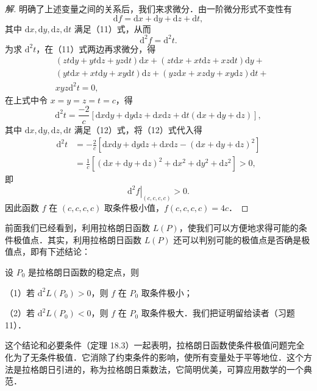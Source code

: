 \begin{proof}[解]
明确了上述变量之间的关系后，我们来求微分．由一阶微分形式不变性有
\[
\mathrm{d}f=\mathrm{d}x+\mathrm{d}y+\mathrm{d}z+\mathrm{d}t,
\]
其中 $\mathrm{d}x,\mathrm{d}y,\mathrm{d}z,\mathrm{d}t$ 满足（11）式，从而
\[
\mathrm{d}^{2}f=\mathrm{d}^{2}t.
\]
为求 $\mathrm{d}^{2}t$，在（11）式两边再求微分，得
\[
\begin{aligned}
&\left(zt\mathrm{d}y+yt\mathrm{d}z+yz\mathrm{d}t\right)\mathrm{d}x+\left(zt\mathrm{d}x+xt\mathrm{d}z+xz\mathrm{d}t\right)\mathrm{d}y+\\
&\left(yt\mathrm{d}x+xt\mathrm{d}y+xy\mathrm{d}t\right)\mathrm{d}z+\left(yz\mathrm{d}x+xz\mathrm{d}y+xy\mathrm{d}z\right)\mathrm{d}t+\\
&xyz\mathrm{d}^{2}t=0,
\end{aligned}
\]
在上式中令 $x=y=z=t=c$，得
\[
\mathrm{d}^{2}t=\frac{-2}{c}\left[\mathrm{d}x\mathrm{d}y+\mathrm{d}y\mathrm{d}z+\mathrm{d}x\mathrm{d}z+\mathrm{d}t\left(\mathrm{d}x+\mathrm{d}y+\mathrm{d}z\right)\right],
\]
其中 $\mathrm{d}x,\mathrm{d}y,\mathrm{d}z,\mathrm{d}t$ 满足（12）式，将（12）式代入得
\[
\begin{aligned}
\mathrm{d}^{2}t&=-\frac{2}{c}\left[\mathrm{d}x\mathrm{d}y+\mathrm{d}y\mathrm{d}z+\mathrm{d}x\mathrm{d}z-\left(\mathrm{d}x+\mathrm{d}y+\mathrm{d}z\right)^{2}\right]\\
&=\frac{1}{c}\left[\left(\mathrm{d}x+\mathrm{d}y+\mathrm{d}z\right)^{2}+\mathrm{d}x^{2}+\mathrm{d}y^{2}+\mathrm{d}z^{2}\right]>0,
\end{aligned}
\]
即
\[
\left.\mathrm{d}^{2}f\right|_{(c,c,c,c)}>0.
\]
因此函数 $f$ 在 $(c,c,c,c)$ 取条件极小值，$f(c,c,c,c)=4c$．
\end{proof}

前面我们已经看到，利用拉格朗日函数 $L(P)$，使我们可以方便地求得可能的条件极值点．其实，利用拉格朗日函数 $L(P)$ 还可以判别可能的极值点是否确是极值点，即有下述结论：

设 $P_{0}$ 是拉格朗日函数的稳定点，则

（1）若 $\mathrm{d}^{2}L(P_{0})>0$，则 $f$ 在 $P_{0}$ 取条件极小；

（2）若 $\mathrm{d}^{2}L(P_{0})<0$，则 $f$ 在 $P_{0}$ 取条件极大．我们把证明留给读者（习题 11）．

这个结论和必要条件（定理 18.3）一起表明，拉格朗日函数使条件极值问题完全化为了无条件极值．它消除了约束条件的影响，使所有变量处于平等地位．这个方法是拉格朗日引进的，称为拉格朗日乘数法，它简明优美，可算应用数学的一个典范．

